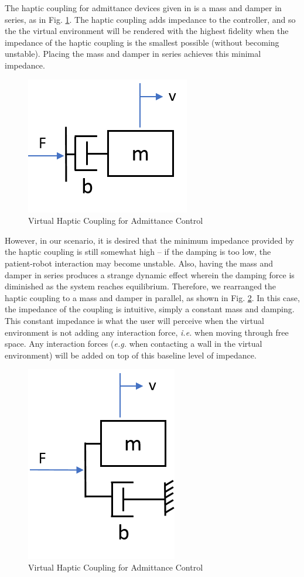 \documentclass[12pt]{report}
\begin{document}
The haptic coupling for admittance devices given in \cite{Adams1999} is a mass and damper in series, as in Fig. \ref{fig:haptic_coupling_original}. The haptic coupling adds impedance to the controller, and so the the virtual environment will be rendered with the highest fidelity when the impedance of the haptic coupling is the smallest possible (without becoming unstable). Placing the mass and damper in series achieves this minimal impedance.  	

	
	\begin{figure}[h] 
	\centering
\includegraphics[width=0.3\linewidth]{haptic_coupling_original}
		\caption{Virtual Haptic Coupling for Admittance Control}
		\label{fig:haptic_coupling_original}
	\end{figure} 
	
	However, in our scenario, it is desired that the minimum impedance provided by the haptic coupling is still somewhat high -- if the damping is too low, the patient-robot interaction may become unstable. Also, having the mass and damper in series produces a strange dynamic effect wherein the damping force is diminished as the system reaches equilibrium. Therefore, we rearranged the haptic coupling to a mass and damper in parallel, as shown in Fig. \ref{fig:haptic_coupling}. In this case, the impedance of the coupling is intuitive, simply a constant mass and damping. This constant impedance is what the user will perceive when the virtual environment is not adding any interaction force, \textit{i.e.} when moving through free space. Any interaction forces (\textit{e.g.} when contacting a wall in the virtual environment) will be added on top of this baseline level of impedance. 
	
	\begin{figure}[h] 
		\centering
		\includegraphics[width=0.3\linewidth]{haptic_coupling}
		\caption{Virtual Haptic Coupling for Admittance Control}
		\label{fig:haptic_coupling}
	\end{figure} 
\end{document}
